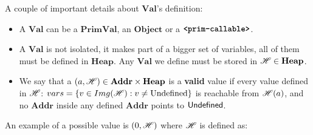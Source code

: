 %
%

A couple of important details about \(\mathbf{Val}\)'s definition:

\begin{itemize}
\tightlist
\item A \(\mathbf{Val}\) can be a \(\mathbf{PrimVal}\), an \(\mathbf{Object}\) or a
  \(\textbf{\texttt{<prim-callable>}}\).
\item A \(\mathbf{Val}\) is not isolated, it makes part of a bigger set of variables, all
  of them must be defined in \(\mathbf{Heap}\). Any \(\mathbf{Val}\) we define must be
  stored in \(\mathscr{H} \in \mathbf{Heap}\).
\item We say that a \((a, \mathscr{H}) \in \mathbf{Addr} \times \mathbf{Heap}\) is a
  \textbf{valid} value if every value defined in \(\mathscr{H}\):
  \(vars = \{v \in Img(\mathscr{H}) : v \ne \text{Undefined}\}\) is reachable from
  \(\mathscr{H}(a)\), and no \(\mathbf{Addr}\) inside any defined \(\mathbf{Addr}\)
  points to \(\mathsf{Undefined}\).
\end{itemize}

An example of a possible value is \((0, \mathscr{H})\) where \(\mathscr{H}\) is defined as:
\\[.4em]

